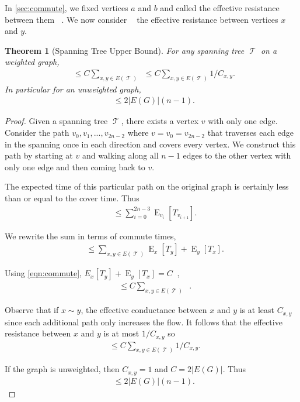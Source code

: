 \documentclass[12pt]{article}
\newtheorem{theorem}{Theorem}
\theoremstyle{definition}
\DeclareMathOperator{\E}{\mathrm{E}}		     %
\DeclareMathOperator{\tcov}{t_\textrm{cov}}      %
\DeclareMathOperator{\Reff}{R_{\textrm{eff}}}    %
\DeclareMathOperator{\Rxy}{R_{\textrm{x,y}}}     %
\DeclareMathOperator{\T}{\mathcal{T}}            %
\begin{document}
In \cref{sec:commute}, we fixed vertices $a$ and $b$ and called
the effective resistance between them $\Reff$.
We now consider $\Rxy$ the effective resistance between vertices $x$ and $y$.

\begin{theorem}[Spanning Tree Upper Bound] \label{thm:span}
For any spanning tree $\T$ on a weighted graph,
\begin{align}
\tcov \leq C \sum_{x,y \in E(\T)} \Rxy \leq C \sum_{x,y \in E(\T)} 1 / C_{x,y}. \nonumber
\end{align}
In particular for an unweighted graph,
\begin{align}
\tcov \leq 2 |E(G)| (n-1). \nonumber 
\end{align}
\end{theorem}

\begin{proof}
Given a spanning tree $\T$, there exists a vertex $v$ with only one edge.
Consider the path $v_0, v_1, ..., v_{2n-2}$ where $v=v_0=v_{2n-2}$
that traverses each edge in the spanning once in each direction
and covers every vertex.
We construct this path by starting at $v$ and walking along all $n-1$ edges to the
other vertex with only one edge and then coming back to $v$.

The expected time of this particular path on the original graph is certainly less than
or equal to the cover time. Thus
\begin{align}
\tcov &\leq \sum_{i=0}^{2n-3} \E_{v_i}[T_{v_{i+1}}]. \nonumber
\end{align}

We rewrite the sum in terms of commute times,
\begin{align}
\tcov &\leq \sum_{x,y \in E(\T)} \E_x[T_y] + \E_y[T_x]. \nonumber
\end{align}

Using \cref{eqn:commute}, $E_x[T_y] + \E_y[T_x] = C \Rxy$,
\begin{align}
\tcov &\leq C \sum_{x,y \in E(\T)} \Rxy. \nonumber
\end{align}

Observe that if $x \sim y$,
the effective conductance between $x$ and $y$ is at least $C_{x,y}$
since each additional path only increases the flow.
It follows that the effective resistance between $x$ and $y$ is at most $1 / C_{x,y}$ so
\begin{align}
\tcov &\leq C \sum_{x,y \in E(\T)} 1 / C_{x,y}. \nonumber
\end{align}

If the graph is unweighted, then $C_{x,y} = 1$ and $C = 2 |E(G)|$.
Thus
\begin{align}
\tcov \leq 2 |E(G)| (n-1). \nonumber
\end{align}

\end{proof}
\end{document}
